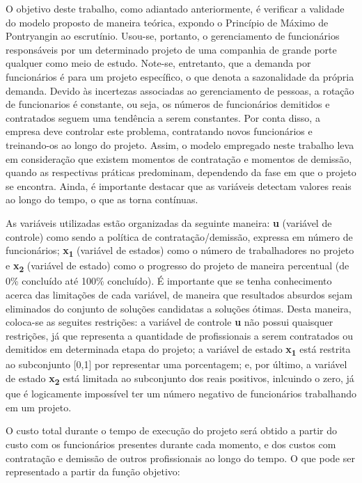 \documentclass[14pt, oneside]{book}
\theoremstyle{definition}
\begin{document}
            O objetivo deste trabalho, como adiantado anteriormente, é verificar a validade do modelo proposto de maneira teórica, expondo o Princípio de Máximo de Pontryangin ao escrutínio. Usou-se, portanto, o gerenciamento de funcionários responsáveis por um determinado projeto de uma companhia de grande porte qualquer como meio de estudo. Note-se, entretanto, que a demanda por funcionários é para um projeto específico, o que denota a sazonalidade da própria demanda. Devido às incertezas associadas ao gerenciamento de pessoas, a rotação de funcionarios é constante, ou seja, os números de funcionários demitidos e contratados seguem uma tendência a serem constantes. Por conta disso, a empresa deve controlar este problema, contratando novos funcionários e treinando-os ao longo do projeto. Assim, o modelo empregado neste trabalho leva em consideração que existem momentos de contratação e momentos de demissão, quando as respectivas práticas predominam, dependendo da fase em que o projeto se encontra. Ainda, é importante destacar que as variáveis detectam valores reais ao longo do tempo, o que as torna contínuas. 
            
             As variáveis utilizadas estão organizadas da seguinte maneira: \textbf{u} (variável de controle) como sendo a política de contratação/demissão, expressa em número de funcionários; \textbf{x\textsubscript{1}} (variável de estados) como o número de trabalhadores no projeto e \textbf{x\textsubscript{2}} (variável de estado) como o progresso do projeto de maneira percentual (de 0\% concluído até 100\% concluído). É importante que se tenha conhecimento acerca das limitações de cada variável, de maneira que resultados absurdos sejam eliminados do conjunto de soluções candidatas a soluções ótimas. Desta maneira, coloca-se as seguites restrições: a variável de controle \textbf{u} não possui quaisquer restrições, já que representa a quantidade de profissionais a serem contratados ou demitidos em determinada etapa do projeto; a variável de estado \textbf{x\textsubscript{1}} está restrita ao subconjunto [0,1] por representar uma porcentagem; e, por último, a variável de estado \textbf{x\textsubscript{2}} está limitada ao subconjunto dos reais positivos, inlcuindo o zero, já que é logicamente impossível ter um número negativo de funcionários trabalhando em um projeto.
             
            O custo total durante o tempo de execução do projeto será obtido a partir do custo com os funcionários presentes durante cada momento, e dos custos com contratação e demissão de outros profissionais ao longo do tempo. O que pode ser representado a partir da função objetivo:
            
\end{document}
